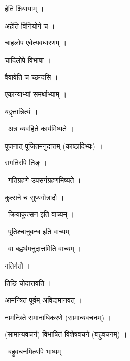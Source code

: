 \documentclass[10pt, openany, oneside]{book}
\begin{document}
\noindent हेति क्षियायाम् ।

\noindent अहेति विनियोगे च ।

\noindent चाहलोप एवेत्यवधारणम् ।

\noindent चादिलोपे विभाषा ।

\noindent वैवावेति च च्छन्दसि ।

\noindent एकान्याभ्यां समर्थाभ्याम् ।

\noindent यद्वृत्तान्नित्यं ।

\par\noindent\hspace{1.5em}{\vps वा॰}~{\qt अत्र व्यवहिते कार्यमिष्यते ।}

\noindent पूजनात् पूजितमनुदात्तम् (काष्ठादिभ्यः) ।

\noindent सगतिरपि तिङ् ।

\par\noindent\hspace{1.5em}{\vps वा॰}~{\qt गतिग्रहणे उपसर्गग्रहणमिष्यते ।}

\noindent कुत्सने च सुप्यगोत्रादौ ।

\par\noindent\hspace{1.5em}{\vps वा॰}~{\qt क्रियाकुत्सन इति वाच्यम् ।}

\par\noindent\hspace{1.5em}{\vps वा॰}~{\qt पूतिश्चानुबन्ध इति वाच्यम् ।}

\par\noindent\hspace{1.5em}{\vps वा॰}~{\qt वा बह्वर्थमनुदात्तमिति वाच्यम् ।}

\noindent गतिर्गतौ ।

\noindent तिङि चोदात्तवति ।

\noindent आमन्त्रितं पूर्वम् अविद्यमानवत् ।

\noindent नामन्त्रिते समानाधिकरणे (सामान्यवचनम्) ।

\noindent (सामान्यवचनं) विभाषितं विशेषवचने (बहुवचनम्) ।

\par\noindent\hspace{1.5em}{\vps वा॰}~{\qt बहुवचनमित्यपि भाष्यम् ।}
\end{document}
